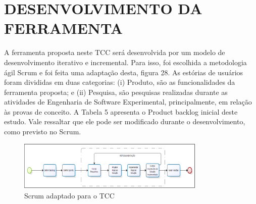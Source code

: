 \section{DESENVOLVIMENTO DA FERRAMENTA}

A ferramenta proposta neste TCC será  desenvolvida por um modelo de desenvolvimento iterativo e incremental. Para isso, foi escolhida a metodologia ágil  Scrum e foi feita uma adaptação desta, figura 28. As estórias de usuários foram divididas em duas categorias: (i) Produto, são as funcionalidades da ferramenta proposta; e (ii) Pesquisa, são pesquisas realizadas durante as atividades de Engenharia de Software Experimental, principalmente, em relação às provas de conceito. A Tabela 5 apresenta o Product backlog inicial deste estudo. Vale ressaltar que ele pode ser modificado durante o desenvolvimento, como previsto no Scrum.

\begin{figure}[h]
\centering
\label{f28}
\includegraphics[width=0.8\textwidth]{figuras/f28}
\caption{Scrum adaptado para o TCC}
\end{figure}

